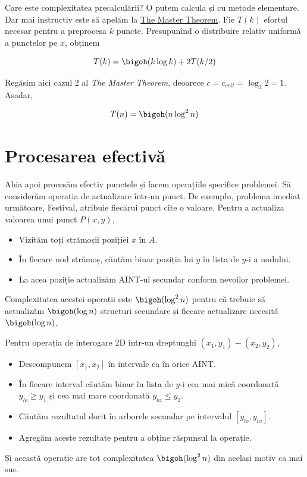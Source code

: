 Care este complexitatea precalculării? O putem calcula și cu metode elementare. Dar mai instructiv este să apelăm la \href{https://en.wikipedia.org/wiki/Master_theorem_\%28analysis_of_algorithms\%29}{The Master Theorem}. Fie $T(k)$ efortul necesar pentru a preprocesa $k$ puncte. Presupunînd o distribuire relativ uniformă a punctelor pe $x$, obținem

$$T(k) = \bigoh(k \log k) + 2T(k/2)$$

Regăsim aici cazul 2 al \textit{The Master Theorem}, deoarece $c = c_{crit} = \log_2 2 = 1$. Așadar,

$$T(n) = \bigoh(n \log^2 n)$$

\section{Procesarea efectivă}

Abia apoi procesăm efectiv punctele și facem operațiile specifice problemei. Să considerăm operația de actualizare într-un punct. De exemplu, problema imediat următoare, Festival, atribuie fiecărui punct cîte o valoare. Pentru a actualiza valoarea unui punct $P(x, y)$,

\begin{itemize}
  \item Vizităm toți strămoșii poziției $x$ în $A$.
  \item În fiecare nod strămoș, căutăm binar poziția lui $y$ în lista de $y$-i a nodului.
  \item La acea poziție actualizăm AINT-ul secundar conform nevoilor problemei.
\end{itemize}

Complexitatea acestei operații este $\bigoh(\log^2 n)$ pentru că trebuie să actualizăm $\bigoh(\log n)$ structuri secundare și fiecare actualizare necesită $\bigoh(\log n)$.

Pentru operația de interogare 2D într-un dreptunghi $(x_1, y_1) - (x_2, y_2)$,

\begin{itemize}
  \item Descompunem $[x_1, x_2]$ în intervale ca în orice AINT.
  \item În fiecare interval căutăm binar în lista de $y$-i cea mai mică coordonată $y_{lo} \geq y_1$ și cea mai mare coordonată $y_{hi} \leq y_2$.
  \item Căutăm rezultatul dorit în arborele secundar pe intervalul $[y_{lo}, y_{hi}]$.
  \item Agregăm aceste rezultate pentru a obține răspunsul la operație.
\end{itemize}

Și această operație are tot complexitatea $\bigoh(\log^2 n)$ din același motiv ca mai sus.
